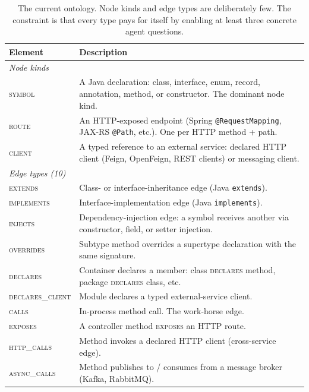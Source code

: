 \documentclass[11pt,a4paper]{article}
\begin{document}
\begin{table}[H]
\centering
\small
\caption{The current ontology. Node kinds and edge types are deliberately few. The constraint is that every type pays for itself by enabling at least three concrete agent questions.}
\label{tab:ontology}
\begin{tabularx}{\textwidth}{l X}
\toprule
\textbf{Element} & \textbf{Description} \\
\midrule
\multicolumn{2}{l}{\emph{Node kinds}} \\
\textsc{symbol}  & A Java declaration: class, interface, enum, record, annotation, method, or constructor. The dominant node kind. \\
\textsc{route}   & An HTTP-exposed endpoint (Spring \texttt{@RequestMapping}, JAX-RS \texttt{@Path}, etc.). One per HTTP method + path. \\
\textsc{client}  & A typed reference to an external service: declared HTTP client (Feign, OpenFeign, REST clients) or messaging client. \\
\midrule
\multicolumn{2}{l}{\emph{Edge types (10)}} \\
\textsc{extends}        & Class- or interface-inheritance edge (Java \texttt{extends}). \\
\textsc{implements}     & Interface-implementation edge (Java \texttt{implements}). \\
\textsc{injects}        & Dependency-injection edge: a symbol receives another via constructor, field, or setter injection. \\
\textsc{overrides}      & Subtype method overrides a supertype declaration with the same signature. \\
\textsc{declares}       & Container declares a member: class \textsc{declares} method, package \textsc{declares} class, etc. \\
\textsc{declares\_client} & Module declares a typed external-service client. \\
\textsc{calls}          & In-process method call. The work-horse edge. \\
\textsc{exposes}        & A controller method \textsc{exposes} an HTTP route. \\
\textsc{http\_calls}    & Method invokes a declared HTTP client (cross-service edge). \\
\textsc{async\_calls}   & Method publishes to / consumes from a message broker (Kafka, RabbitMQ). \\
\bottomrule
\end{tabularx}
\end{table}
\end{document}
